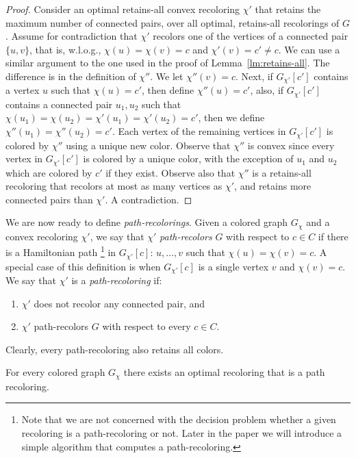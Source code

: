 \begin{proof}
Consider an optimal retains-all convex recoloring $\chi'$ 
that retains the maximum number of connected pairs, 
over all optimal, 
retains-all recolorings of $G$.  
%
Assume for contradiction that $\chi'$ 
recolors one of the vertices of a connected pair $\{u, v\}$, 
that is, 
w.l.o.g., 
$\chi(u) = \chi(v) = c$ and $\chi'(v) = c' \neq c$.
%
We can use a similar argument to the one used in the proof of Lemma~\ref{lm:retains-all}.
%
The difference is in the definition of $\chi''$.  
%
We let $\chi''(v) = c$. 
Next, if $G_{\chi'}[c']$ contains a vertex $u$ such that $\chi(u) = c'$, 
then define $\chi''(u) = c'$, 
also, if $G_{\chi'}[c']$ contains a connected pair $u_1, u_2$ 
such that $\chi(u_1) = \chi(u_2) = \chi'(u_1) = \chi'(u_2) = c'$, 
then we define $\chi''(u_1) = \chi''(u_2) = c'$.
Each vertex of the remaining vertices in $G_{\chi'}[c']$ is colored by $\chi''$ 
using a unique new color.
%
Observe that $\chi''$ is convex since every vertex in
$G_{\chi'}[c']$ is colored by a unique color,
with the exception of $u_1$ and $u_2$ which are colored by $c'$ if they exist. 
%
Observe also that $\chi''$ is a retains-all recoloring that recolors at most as
many vertices as $\chi'$, and retains more connected pairs than $\chi'$. 
%
A contradiction.
{}\end{proof}

We are now ready to define \emph{path-recolorings}.
%
Given a colored graph $G_\chi$ and a convex recoloring $\chi'$, 
we say that $\chi'$ \emph{path-recolors} $G$ with respect to $c \in C$ 
if there is a Hamiltonian path 
\footnote{
Note that we are not concerned with the decision problem whether a given recoloring 
is a path-recoloring or not.
Later in the paper we will introduce a simple algorithm that computes a path-recoloring. 
} 
in $G_{\chi'}[c]$: 
$u, \dots, v$ such that $\chi(u) = \chi(v) = c$.
%
A special case of this definition is when  $G_{\chi'}[c]$ 
is a single vertex $v$ and $\chi(v) = c$.
%
We say that $\chi'$ is a \emph{path-recoloring} if:
\begin{enumerate}
	\item $\chi'$ does not recolor any connected pair, and 
	\item $\chi'$ path-recolors $G$ with respect to every $c \in C$.
\end{enumerate}
Clearly, every path-recoloring also retains all colors.

\begin{lemma}
\label{lm:optimal_path_recoloring}
For every colored graph $G_\chi$ 
there exists an optimal recoloring that is a path recoloring.
\end{lemma}

